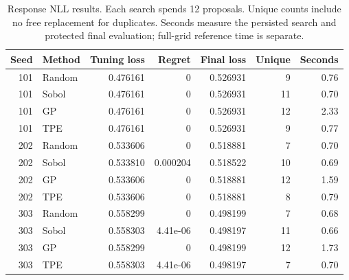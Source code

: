 \begin{table}[htbp]
\centering\small
\begin{tabular}{rlrrrrr}
\toprule
Seed & Method & Tuning loss & Regret & Final loss & Unique & Seconds \\
\midrule
101 & Random & 0.476161 & 0 & 0.526931 & 9 & 0.76 \\
101 & Sobol & 0.476161 & 0 & 0.526931 & 11 & 0.70 \\
101 & GP & 0.476161 & 0 & 0.526931 & 12 & 2.33 \\
101 & TPE & 0.476161 & 0 & 0.526931 & 9 & 0.77 \\
202 & Random & 0.533606 & 0 & 0.518881 & 7 & 0.70 \\
202 & Sobol & 0.533810 & 0.000204 & 0.518522 & 10 & 0.69 \\
202 & GP & 0.533606 & 0 & 0.518881 & 12 & 1.59 \\
202 & TPE & 0.533606 & 0 & 0.518881 & 8 & 0.79 \\
303 & Random & 0.558299 & 0 & 0.498199 & 7 & 0.68 \\
303 & Sobol & 0.558303 & 4.41e-06 & 0.498197 & 11 & 0.66 \\
303 & GP & 0.558299 & 0 & 0.498199 & 12 & 1.73 \\
303 & TPE & 0.558303 & 4.41e-06 & 0.498197 & 7 & 0.70 \\
\bottomrule
\end{tabular}
\caption{Response NLL results. Each search spends 12 proposals. Unique counts include no free replacement for duplicates. Seconds measure the persisted search and protected final evaluation; full-grid reference time is separate.}
\end{table}
